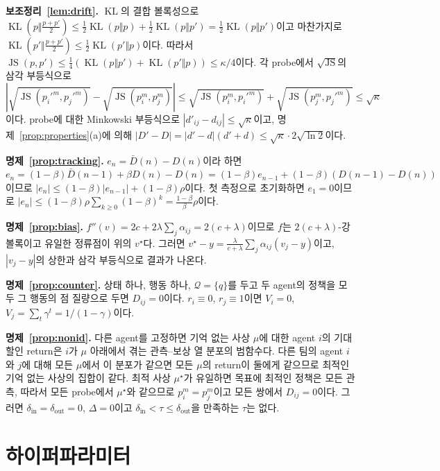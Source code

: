 \documentclass[twocolumn,10pt]{article}
\theoremstyle{remark}
\newcommand{\JS}{\operatorname{JS}}
\newcommand{\KL}{\operatorname{KL}}
\begin{document}
\textbf{보조정리~\ref{lem:drift}.} $\KL$의 결합 볼록성으로 $\KL(p\Vert\frac{p+p'}{2})\le\frac12\KL(p\Vert p)+\frac12\KL(p\Vert p')=\frac12\KL(p\Vert p')$이고
마찬가지로 $\KL(p'\Vert\frac{p+p'}{2})\le\frac12\KL(p'\Vert p)$이다. 따라서 $\JS(p,p')\le\frac14(\KL(p\Vert p')+\KL(p'\Vert p))\le\kappa/4$이다.
각 probe에서 $\sqrt{\JS}$의 삼각 부등식으로
$|\sqrt{\JS(p_i'^m,p_j'^m)}-\sqrt{\JS(p_i^m,p_j^m)}|\le\sqrt{\JS(p_i^m,p_i'^m)}+\sqrt{\JS(p_j^m,p_j'^m)}\le\sqrt{\kappa}$이다. probe에 대한
Minkowski 부등식으로 $|d'_{ij}-d_{ij}|\le\sqrt{\kappa}$이고, 명제~\ref{prop:properties}(a)에 의해
$|D'-D|=|d'-d|(d'+d)\le\sqrt{\kappa}\cdot2\sqrt{\ln 2}$이다.

\textbf{명제~\ref{prop:tracking}.} $e_n=\bar D(n)-D(n)$이라 하면 $e_n=(1-\beta)\bar D(n-1)+\beta D(n)-D(n)=(1-\beta)e_{n-1}+(1-\beta)(D(n-1)-D(n))$이므로
$|e_n|\le(1-\beta)|e_{n-1}|+(1-\beta)\rho$이다. 첫 측정으로 초기화하면 $e_1=0$이므로
$|e_n|\le(1-\beta)\rho\sum_{k\ge0}(1-\beta)^k=\frac{1-\beta}{\beta}\rho$이다.

\textbf{명제~\ref{prop:bias}.} $f''(v)=2c+2\lambda\sum_j\alpha_{ij}=2(c+\lambda)$이므로 $f$는 $2(c+\lambda)$-강볼록이고 유일한 정류점이
위의 $v^\star$다. 그러면 $v^\star-y=\frac{\lambda}{c+\lambda}\sum_j\alpha_{ij}(v_j-y)$이고, $|v_j-y|$의 상한과 삼각 부등식으로 결과가
나온다.

\textbf{명제~\ref{prop:counter}.} 상태 하나, 행동 하나, $\mathcal{Q}=\{q\}$를 두고 두 agent의 정책을 모두 그 행동의 점 질량으로 두면
$D_{ij}=0$이다. $r_i\equiv0$, $r_j\equiv1$이면 $V_i=0$, $V_j=\sum_t\gamma^t=1/(1-\gamma)$이다.

\textbf{명제~\ref{prop:nonid}.} 다른 agent를 고정하면 기억 없는 사상 $\mu$에 대한 agent $i$의 기대 할인 return은 $i$가 $\mu$ 아래에서
겪는 관측--보상 열 분포의 범함수다. 다른 팀의 agent $i$와 $j$에 대해 모든 $\mu$에서 이 분포가 같으면 모든 $\mu$의 return이 둘에게
같으므로 최적인 기억 없는 사상의 집합이 같다. 최적 사상 $\mu^\star$가 유일하면 목표에 최적인 정책은 모든 관측, 따라서 모든 probe에서
$\mu^\star$와 같으므로 $p_i^m=p_j^m$이고 모든 쌍에서 $D_{ij}=0$이다. 그러면 $\delta_{\mathrm{in}}=\delta_{\mathrm{out}}=0$, $\Delta=0$이고
$\delta_{\mathrm{in}}<\tau\le\delta_{\mathrm{out}}$을 만족하는 $\tau$는 없다.

\section{하이퍼파라미터}
\label{app:hyper}
\begin{table}[h]
\centering
\small

\caption{처음부터 학습한 E1 비교의 설정(donor 집합 외에는 모든 방법이 같다). 본 과제 B는 agent 수(6), 팀당 요청(3), 통신
범위(3), 팀 보상, 목표 위치가 다르다.}
\end{table}
\end{document}
